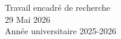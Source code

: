 \begin{titlepage}
    \vfill
    
    {\large Travail encadré de recherche}\\
    \vspace{0.2cm}
    {\large 29 Mai 2026}\\
    \vspace{0.2cm}
    {\large Année universitaire 2025-2026}
    
\end{titlepage}